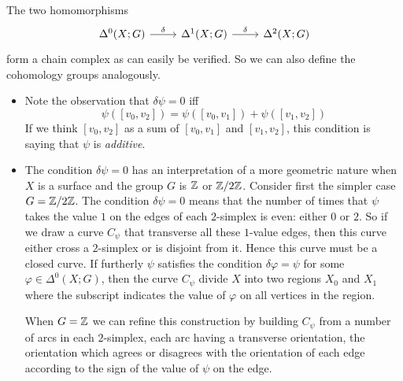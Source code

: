 The two homomorphisms
\[\begin{tikzcd}
\Delta^0(X;G)\ar[r,"\delta"]&\Delta^1(X;G)\ar[r,"\delta"]&\Delta^2(X;G)
\end{tikzcd}\]
form a chain complex as can easily be verified. So we can also define the cohomology groups analogously.\par
\begin{itemize}
\item Note the observation that $\delta\psi=0$ iff
\[\psi([v_0,v_2])=\psi([v_0,v_1])+\psi([v_1,v_2])\]
If we think $[v_0,v_2]$ as a sum of $[v_0,v_1]$ and $[v_1,v_2]$, this condition is saying that $\psi$ is \textit{additive}.
\item The condition $\delta\psi=0$ has an interpretation of a more geometric nature when $X$ is a surface and the group $G$ is $\mathbb{Z}$ or $\mathbb{Z}/2\mathbb{Z}$. Consider first the simpler case $G=\mathbb{Z}/2\mathbb{Z}$. The condition $\delta\psi=0$ means that the number of times that $\psi$ takes the value $1$ on the edges of each $2$-simplex is even: either $0$ or $2$. So if we draw a curve $C_\psi$ that transverse all these $1$-value edges, then this curve either cross a $2$-simplex or is disjoint from it. Hence this curve must be a closed curve. If furtherly $\psi$ satisfies the condition $\delta\varphi=\psi$ for some $\varphi\in\Delta^0(X;G)$, then the curve $C_\psi$ divide $X$ into two regions
$X_0$ and $X_1$ where the subscript indicates the value of $\varphi$ on all vertices in the region.\par
When $G=\mathbb{Z}$ we can refine this construction by building $C_\psi$ from a number of arcs in each $2$-simplex, each arc having a transverse orientation, the orientation which agrees or disagrees with the orientation of each edge according to the sign of the value of $\psi$ on the edge. 

\end{itemize}
